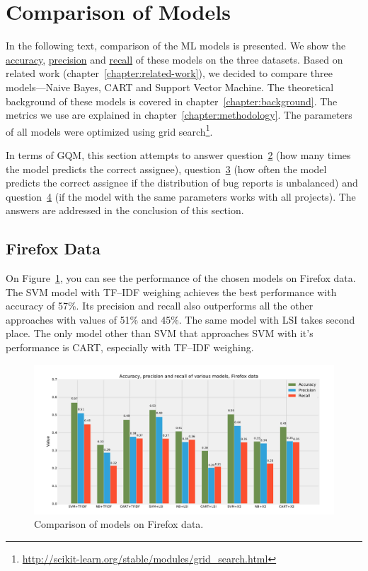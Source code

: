 \section{Comparison of Models}

In the following text, comparison of the ML models is presented. We show the \hyperlink{metric:a}{accuracy}, \hyperlink{metric:p}{precision} and \hyperlink{metric:r}{recall} of these models on the three datasets. Based on related work (chapter~\ref{chapter:related-work}), we decided to compare three models---Naive Bayes, CART and Support Vector Machine. The theoretical background of these models is covered in chapter~\ref{chapter:background}. The metrics we use are explained in chapter~\ref{chapter:methodology}. The parameters of all models were optimized using grid search\footnote{\url{http://scikit-learn.org/stable/modules/grid\_search.html}}.

In terms of GQM, this section attempts to answer question~\hyperlink{question:2}{2} (how many times the model predicts the correct assignee), question~\hyperlink{question:3}{3} (how often the model predicts the correct assignee if the distribution of bug reports is unbalanced) and question~\hyperlink{question:4}{4} (if the model with the same parameters works with all projects). The answers are addressed in the conclusion of this section.

\subsection{Firefox Data}

On Figure~\ref{fig:results.models.firefox}, you can see the performance of the chosen models on Firefox data. The SVM model with TF--IDF weighing achieves the best performance with accuracy of 57\%. Its precision and recall also outperforms all the other approaches with values of 51\% and 45\%. The same model with LSI takes second place. The only model other than SVM that approaches SVM with it's performance is CART, especially with TF--IDF weighing.

\begin{figure}[htbp]
    \centering
        \includegraphics[width=\textwidth]{./images/comparison_of_models/firefox.pdf}
    \caption{Comparison of models on Firefox data.}
    \label{fig:results.models.firefox}
\end{figure}

